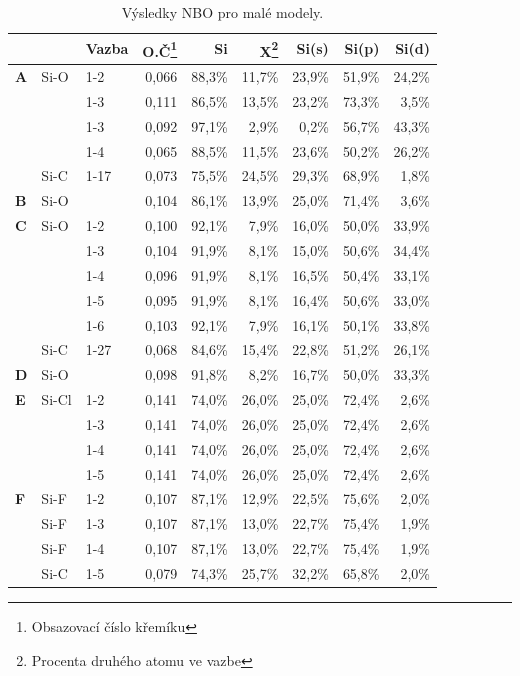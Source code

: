 \documentclass[
  digital, %
  table,   %
  lof,     %
  lot,     %
  oneside,
]{fithesis3}
\begin{document}
\begin{table}[htbp]
  \begin{minipage}{\textwidth}
\caption{Výsledky NBO pro malé modely.}
\begin{center}
  \begin{tabular}{|l|l|l|r|r|r|r|r|r|}
  \hline
  \label{nbo_small} &  & Vazba & O.Č\footnote{Obsazovací číslo křemíku} & Si & X\footnote{Procenta druhého atomu ve vazbe} & Si(s) & Si(p) &Si(d) \\ \hline
\textbf{A} & Si-O & 1-2  & 0,066 & 88,3\% & 11,7\% & 23,9\% & 51,9\% & 24,2\% \\ \hline
   &  & 1-3 & 0,111 & 86,5\% & 13,5\% & 23,2\% & 73,3\% & 3,5\% \\ \hline
   &  & 1-3 & 0,092 & 97,1\% & 2,9\% & 0,2\% & 56,7\% & 43,3\% \\ \hline
   &  & 1-4 & 0,065 & 88,5\% & 11,5\% & 23,6\% & 50,2\% & 26,2\% \\ \hline
   & Si-C & 1-17 & 0,073 & 75,5\% & 24,5\% & 29,3\% & 68,9\% & 1,8\% \\ \hline
  \textbf{B} & Si-O &  & 0,104 & 86,1\% & 13,9\% & 25,0\% & 71,4\% & 3,6\% \\ \hline
 \textbf{C} & Si-O & 1-2  & 0,100 & 92,1\% & 7,9\% & 16,0\% & 50,0\% & 33,9\% \\ \hline
   &  & 1-3 & 0,104 & 91,9\% & 8,1\% & 15,0\% & 50,6\% & 34,4\% \\ \hline
   &  & 1-4 & 0,096 & 91,9\% & 8,1\% & 16,5\% & 50,4\% & 33,1\% \\ \hline
   &  & 1-5 & 0,095 & 91,9\% & 8,1\% & 16,4\% & 50,6\% & 33,0\% \\ \hline
   &  & 1-6 & 0,103 & 92,1\% & 7,9\% & 16,1\% & 50,1\% & 33,8\% \\ \hline
   & Si-C & 1-27 & 0,068 & 84,6\% & 15,4\% & 22,8\% & 51,2\% & 26,1\% \\ \hline
  \textbf{D} & Si-O &  & 0,098 & 91,8\% & 8,2\% & 16,7\% & 50,0\% & 33,3\% \\ \hline
  \textbf{E} & Si-Cl & 1-2  & 0,141 & 74,0\% & 26,0\% & 25,0\% & 72,4\% & 2,6\% \\ \hline
   &  & 1-3 & 0,141 & 74,0\% & 26,0\% & 25,0\% & 72,4\% & 2,6\% \\ \hline
   &  & 1-4 & 0,141 & 74,0\% & 26,0\% & 25,0\% & 72,4\% & 2,6\% \\ \hline
   &  & 1-5 & 0,141 & 74,0\% & 26,0\% & 25,0\% & 72,4\% & 2,6\% \\ \hline
  \textbf{F}  & Si-F &1-2 &0,107 & 87,1\% & 12,9\% & 22,5\% & 75,6\% & 2,0\% \\ \hline
 & Si-F &1-3 & 0,107 & 87,1\% & 13,0\% & 22,7\% & 75,4\% & 1,9\% \\ \hline
 & Si-F &1-4 &0,107 & 87,1\% & 13,0\% & 22,7\% & 75,4\% & 1,9\% \\ \hline
 & Si-C &1-5 &0,079 & 74,3\% & 25,7\% & 32,2\% & 65,8\% & 2,0\% \\ \hline
  \end{tabular}
\end{center}
\end{minipage}
\end{table}
\end{document}
